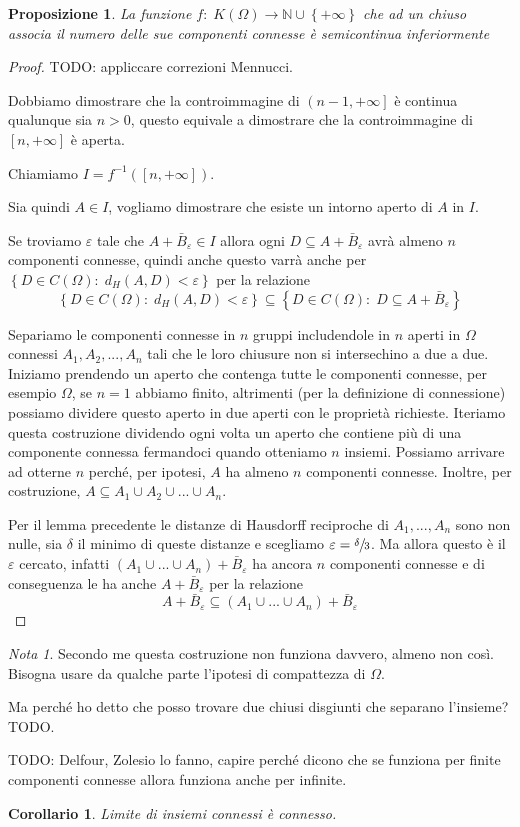 \documentclass[a4paper,10pt]{article}
\newcounter{counter1}
\theoremstyle{plain}
\newtheorem{mypro}[counter1]{Proposizione}
\newtheorem{mycor}[counter1]{Corollario}
\theoremstyle{definition}
\theoremstyle{remark}
\newtheorem{mynot}[counter1]{Nota}
\newcommand{\set}[1]{\left\{#1\right\}}
\newcommand{\pa}[1]{\left(#1\right)}
\newcommand{\bra}[1]{\left[#1\right]}
\begin{document}
\begin{mypro}
  La funzione $f:\; K(\Omega) \rightarrow \mathbb{N} \cup \set{+\infty}$
  che ad un chiuso associa il numero delle sue componenti connesse è
  semicontinua inferiormente
\end{mypro}
\begin{proof}
  TODO: appliccare correzioni Mennucci.

  Dobbiamo dimostrare che la controimmagine di $\left(n-1,
    +\infty\right]$ è continua qualunque sia $n>0$, questo equivale a
  dimostrare che la controimmagine di $\bra{n,+\infty}$ è aperta.

  Chiamiamo $I = f^{-1}\pa{\bra{n,+\infty}}$.

  Sia quindi $A \in I$, vogliamo dimostrare che esiste un intorno
  aperto di $A$ in $I$.

  Se troviamo $\varepsilon$ tale che $A + \bar B_{\varepsilon} \in I$
  allora ogni $D \subseteq A + \bar B_{\varepsilon}$ avrà almeno $n$
  componenti connesse, quindi anche questo varrà anche per $\set{D \in
    C(\Omega):\; d_H(A,D) < \varepsilon}$ per la relazione
  \[ \set{D \in C(\Omega):\; d_H(A,D) < \varepsilon} \subseteq \set{D
    \in C(\Omega):\; D \subseteq A + \bar B_{\varepsilon}} \]

  Separiamo le componenti connesse in $n$ gruppi includendole in $n$
  aperti in $\Omega$ connessi $A_1,A_2,...,A_n$ tali che le loro
  chiusure non si intersechino a due a due. Iniziamo prendendo un
  aperto che contenga tutte le componenti connesse, per esempio
  $\Omega$, se $n=1$ abbiamo finito, altrimenti (per la definizione di
  connessione) possiamo dividere questo aperto in due aperti con le
  proprietà richieste. Iteriamo questa costruzione dividendo ogni
  volta un aperto che contiene più di una componente connessa
  fermandoci quando otteniamo $n$ insiemi. Possiamo arrivare ad
  otterne $n$ perché, per ipotesi, $A$ ha almeno $n$ componenti
  connesse. Inoltre, per costruzione, $A \subseteq A_1 \cup A_2 \cup
  ... \cup A_n$.

  Per il lemma precedente le distanze di Hausdorff reciproche di $A_1,
  ..., A_n$ sono non nulle, sia $\delta$ il minimo di queste distanze
  e scegliamo $\varepsilon = \sfrac{\delta}{3}$. Ma allora questo è il
  $\varepsilon$ cercato, infatti $\pa{A_1\cup ... \cup A_n} + \bar B
  _\varepsilon$ ha ancora $n$ componenti connesse e di conseguenza le
  ha anche $A + \bar B_{\varepsilon}$ per la relazione
  \[ A + \bar B_{\varepsilon} \subseteq \pa{A_1\cup ... \cup A_n} +
  \bar B_\varepsilon\]
\end{proof}
\begin{mynot}
  Secondo me questa costruzione non funziona davvero, almeno non
  così. Bisogna usare da qualche parte l'ipotesi di compattezza di
  $\Omega$.

  Ma perché ho detto che posso trovare due chiusi disgiunti che
  separano l'insieme? TODO.

  TODO: Delfour, Zolesio lo fanno, capire perché dicono che se
  funziona per finite componenti connesse allora funziona anche per
  infinite.
\end{mynot}
\begin{mycor}
  Limite di insiemi connessi è connesso.
\end{mycor}
\end{document}
